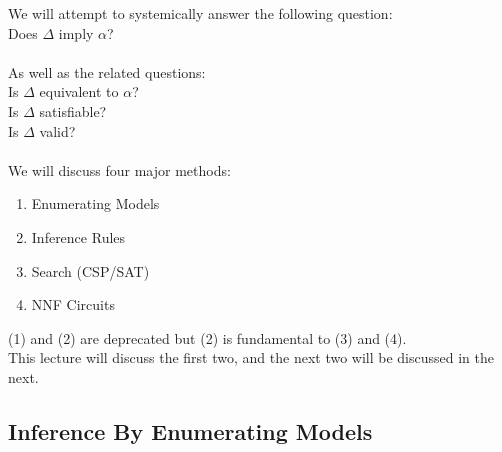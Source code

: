 \documentclass[../../lecture_notes.tex]{subfiles}
\begin{document}
\noindent We will attempt to systemically answer the following question:\\
\indent Does $\Delta$ imply $\alpha$?\\
\\
As well as the related questions:\\
	\indent Is $\Delta$ equivalent to $\alpha$?\\
	\indent Is $\Delta$ satisfiable?\\
	\indent Is $\Delta$ valid?\\
\\
We will discuss four major methods:
\begin{enumerate} [itemsep=0mm]
	\item Enumerating Models
	\item Inference Rules
	\item Search (CSP/SAT)
	\item NNF Circuits
\end{enumerate}
(1) and (2) are deprecated but (2) is fundamental to (3) and (4).\\
This lecture will discuss the first two, and the next two will be discussed in the next.\\

\subsection*{Inference By Enumerating Models}
\end{document}
